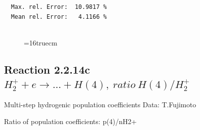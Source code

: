 \documentclass[12pt,dvips]{article}
\begin{document}
\begin{small}
\begin{verbatim}
  Max. rel. Error:  10.9817 %
  Mean rel. Error:   4.1166 %


\end{verbatim}\end{small}
\begin{figure} \label{2.2.14b}
\epsfxsize=16truecm
\end{figure}
\newpage

\subsection{
Reaction 2.2.14c $ H_2^+ + e \rightarrow ...+ H(4) , \   ratio ~ H(4)/H_2^+  $
}

 Multi-step hydrogenic population coefficients
 Data: T.Fujimoto

 Ratio of population coefficients: p(4)/nH2+
\end{document}
